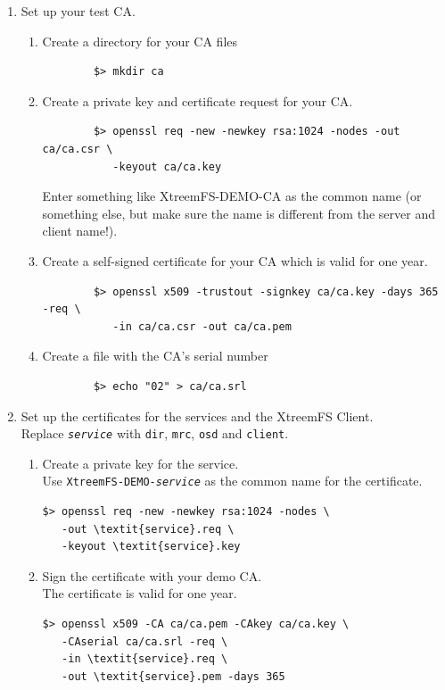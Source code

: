 \documentclass[a4paper,10pt]{book}
\begin{document}
\begin{enumerate}
 \item Set up your test CA.
	\begin{enumerate}
	\item Create a directory for your CA files
		\begin{verbatim}
		$> mkdir ca
		\end{verbatim}

	\item Create a private key and certificate request for your CA.
		\begin{verbatim}
		$> openssl req -new -newkey rsa:1024 -nodes -out ca/ca.csr \
		   -keyout ca/ca.key
		\end{verbatim}

		Enter something like XtreemFS-DEMO-CA as the common name (or something else, but make sure the name is different from the server and client name!).
	\item Create a self-signed certificate for your CA which is valid for one year.
		\begin{verbatim}
		$> openssl x509 -trustout -signkey ca/ca.key -days 365 -req \
		   -in ca/ca.csr -out ca/ca.pem
		\end{verbatim}

	\item Create a file with the CA's serial number
		\begin{verbatim}
		$> echo "02" > ca/ca.srl
		\end{verbatim}

 \end{enumerate}
 \item Set up the certificates for the services and the XtreemFS Client.\\
	Replace \texttt{\textit{service}} with \texttt{dir}, \texttt{mrc}, \texttt{osd} and \texttt{client}.
	\begin{enumerate}
	\item Create a private key for the service.\\
	      Use \texttt{XtreemFS-DEMO-\textit{service}} as the common name for the certificate.
		\begin{Verbatim}[commandchars=\\\{\}]
$> openssl req -new -newkey rsa:1024 -nodes \
   -out \textit{service}.req \
   -keyout \textit{service}.key
		\end{Verbatim}

	\item Sign the certificate with your demo CA.\\
		The certificate is valid for one year.
		\begin{Verbatim}[commandchars=\\\{\}]
$> openssl x509 -CA ca/ca.pem -CAkey ca/ca.key \
   -CAserial ca/ca.srl -req \
   -in \textit{service}.req \
   -out \textit{service}.pem -days 365
		\end{Verbatim}


\end{enumerate}
\end{enumerate}
\end{document}
